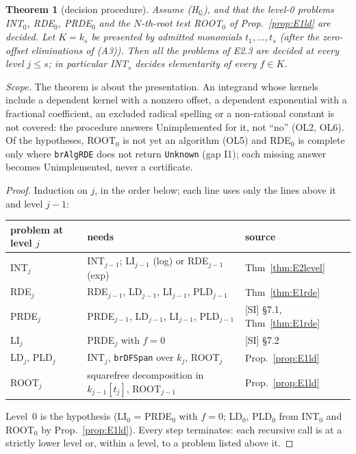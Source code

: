 \documentclass[11pt]{article}
\newtheorem{theorem}{Theorem}[section]
\theoremstyle{definition}
\theoremstyle{remark}
\newcommand{\Q}{\mathbb{Q}}
\newcommand{\code}[1]{\texttt{#1}}
\begin{document}
\begin{theorem}[decision procedure]\label{thm:E2decide}
Assume (H$_\Q$), and that the level-0 problems INT$_0$, RDE$_0$, PRDE$_0$ and the $N$-th-root
test ROOT$_0$ of Prop.~\ref{prop:E1ld} are decided. Let $K=k_s$ be presented by admitted
monomials $t_1,\dots,t_s$ (after the zero-offset eliminations of (A3)). Then all the problems
of E2.3 are decided at every level $j\le s$; in particular INT$_s$ decides elementarity of
every $f\in K$.
\end{theorem}
\noindent\emph{Scope.} The theorem is about the presentation. An integrand whose kernels
include a dependent kernel with a nonzero offset, a dependent exponential with a fractional
coefficient, an excluded radical spelling or a non-rational constant is not covered: the
procedure answers Unimplemented for it, not ``no'' (OL2, OL6). Of the hypotheses, ROOT$_0$ is
not yet an algorithm (OL5) and RDE$_0$ is complete only where \code{brAlgRDE} does not return
\code{Unknown} (gap I1); each missing answer becomes Unimplemented, never a certificate.
\begin{proof}
Induction on $j$, in the order below; each line uses only the lines above it and level $j-1$:
\begin{center}\small
\begin{tabular}{lll}
\toprule
problem at level $j$ & needs & source \\
\midrule
INT$_j$ & INT$_{j-1}$; LI$_{j-1}$ (log) or RDE$_{j-1}$ (exp) & Thm~\ref{thm:E2level}\\
RDE$_j$ & RDE$_{j-1}$, LD$_{j-1}$, LI$_{j-1}$, PLD$_{j-1}$ & Thm~\ref{thm:E1rde}\\
PRDE$_j$ & PRDE$_{j-1}$, LD$_{j-1}$, LI$_{j-1}$, PLD$_{j-1}$ & [SI] \S7.1, Thm~\ref{thm:E1rde}\\
LI$_j$ & PRDE$_j$ with $f=0$ & [SI] \S7.2\\
LD$_j$, PLD$_j$ & INT$_j$, \code{brDFSpan} over $k_j$, ROOT$_j$ & Prop.~\ref{prop:E1ld}\\
ROOT$_j$ & squarefree decomposition in $k_{j-1}[t_j]$, ROOT$_{j-1}$ & Prop.~\ref{prop:E1ld}\\
\bottomrule
\end{tabular}
\end{center}
Level~0 is the hypothesis (LI$_0$ = PRDE$_0$ with $f=0$; LD$_0$, PLD$_0$ from INT$_0$ and
ROOT$_0$ by Prop.~\ref{prop:E1ld}). Every step terminates: each recursive call is at a
strictly lower level or, within a level, to a problem listed above it.
\end{proof}
\end{document}
